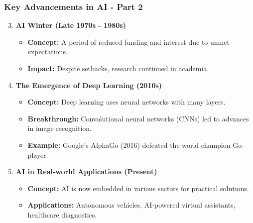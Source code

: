 \documentclass{beamer}
\begin{document}
\begin{frame}[fragile]
    \frametitle{Key Advancements in AI - Part 2}
    \begin{enumerate}
        \setcounter{enumi}{2}
        \item \textbf{AI Winter (Late 1970s - 1980s)}
        \begin{itemize}
            \item \textbf{Concept:} A period of reduced funding and interest due to unmet expectations.
            \item \textbf{Impact:} Despite setbacks, research continued in academia.
        \end{itemize}
        
        \item \textbf{The Emergence of Deep Learning (2010s)}
        \begin{itemize}
            \item \textbf{Concept:} Deep learning uses neural networks with many layers.
            \item \textbf{Breakthrough:} Convolutional neural networks (CNNs) led to advances in image recognition.
            \item \textbf{Example:} Google’s AlphaGo (2016) defeated the world champion Go player.
        \end{itemize}
        
        \item \textbf{AI in Real-world Applications (Present)}
        \begin{itemize}
            \item \textbf{Concept:} AI is now embedded in various sectors for practical solutions.
            \item \textbf{Applications:} Autonomous vehicles, AI-powered virtual assistants, healthcare diagnostics.
        \end{itemize}
    \end{enumerate}
\end{frame}
\end{document}
